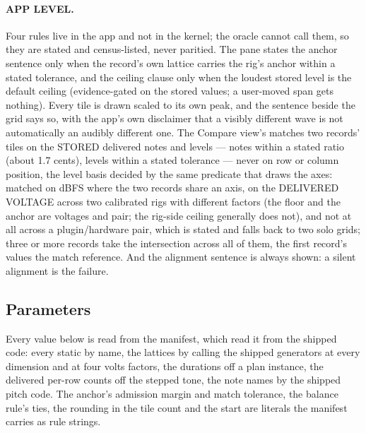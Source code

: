 \documentclass[11pt,a4paper]{article}
\begin{document}
\paragraph{APP LEVEL.} Four rules live in the app and not in the kernel;
the oracle cannot call them, so they are stated and census-listed, never
paritied. The pane states the anchor sentence only when the record's own
lattice carries the rig's anchor within a stated tolerance, and the
ceiling clause only when the loudest stored level is the default ceiling
(evidence-gated on the stored values; a user-moved span gets nothing).
Every tile is drawn scaled to its own peak, and the sentence beside the
grid says so, with the app's own disclaimer that
a visibly different wave is not automatically an audibly different one.
The Compare view's
 matches two records' tiles on the STORED delivered
notes and levels --- notes within a stated ratio (about 1.7 cents), levels
within a stated tolerance --- never on row or column position, the level
basis decided by the same predicate that draws the axes: matched on dBFS
where the two records share an axis, on the DELIVERED VOLTAGE across two
calibrated rigs with different factors (the floor and the anchor are
voltages and pair; the rig-side ceiling generally does not), and not at
all across a plugin/hardware pair, which is stated and falls back to two
solo grids; three or more records take the intersection across all of
them, the first record's values the match reference. And the alignment
sentence is always shown: a silent alignment is the failure.

\subsection{Parameters}
\label{sec:matrix-parameters}
Every value below is read from the manifest, which read it from the
shipped code: every static by name, the lattices by calling the shipped
generators at every dimension and at four volts factors, the durations
off a plan instance, the delivered per-row counts off the stepped tone,
the note names by the shipped pitch code. The anchor's admission margin
and match tolerance, the balance rule's ties, the rounding in the tile
count and the start are literals the manifest carries as rule strings.


\end{document}
